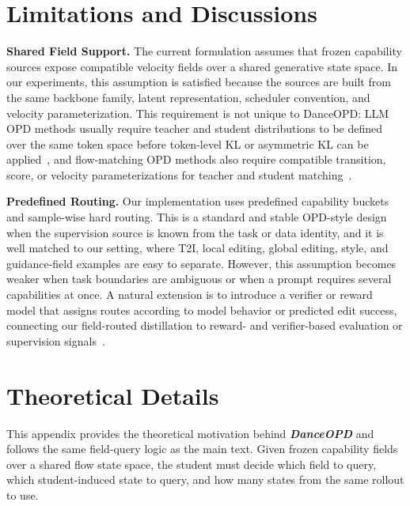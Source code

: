 \documentclass{llmxive}
\providecommand{\name}{\textsl{\textbf{DanceOPD}}\xspace}
\begin{document}
\vspace{0.2cm}


\section{Limitations and Discussions}
\label{sec:limitations}

\noindent\textbf{Shared Field Support.}
The current formulation assumes that frozen capability sources expose compatible velocity fields over a shared generative state space. In our experiments, this assumption is satisfied because the sources are built from the same backbone family, latent representation, scheduler convention, and velocity parameterization. This requirement is not unique to DanceOPD: LLM OPD methods usually require teacher and student distributions to be defined over the same token space before token-level KL or asymmetric KL can be applied~\cite{gu2024minillm,agarwal2024policy,jia2026asymmetric}, and flow-matching OPD methods also require compatible transition, score, or velocity parameterizations for teacher and student matching~\cite{li2026diffusionopd,jiang2026d,fang2026flow}.

\noindent\textbf{Predefined Routing.}
Our implementation uses predefined capability buckets and sample-wise hard routing. This is a standard and stable OPD-style design when the supervision source is known from the task or data identity, and it is well matched to our setting, where T2I, local editing, global editing, style, and guidance-field examples are easy to separate. However, this assumption becomes weaker when task boundaries are ambiguous or when a prompt requires several capabilities at once. A natural extension is to introduce a verifier or reward model that assigns routes according to model behavior or predicted edit success, connecting our field-routed distillation to reward- and verifier-based evaluation or supervision signals~\cite{kirstain2023pick,wu2023human,xu2023imagereward,ku2024viescore,fang2026rubric}.

\vspace{0.2cm}
\section{Theoretical Details}
\label{app:theory}

This appendix provides the theoretical motivation behind \name{} and follows the same field-query logic as the main text. Given frozen capability fields over a shared flow state space, the student must decide which field to query, which student-induced state to query, and how many states from the same rollout to use. 
\end{document}
